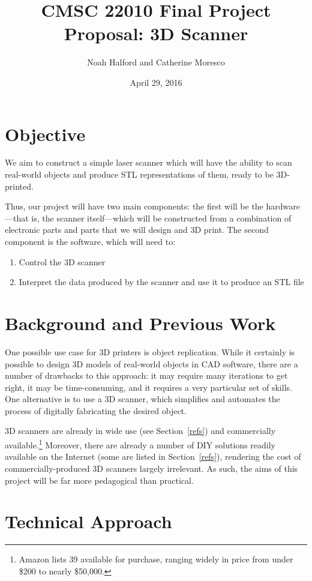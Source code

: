 \documentclass[12pt, letterpaper]{article}
\title{CMSC 22010 Final Project Proposal: 3D Scanner}
\author{Noah Halford and Catherine Moresco}
\date{April 29, 2016}
\begin{document}
\maketitle

\section{Objective}

We aim to construct a simple laser scanner which will have the ability to scan
real-world objects and produce STL representations of them, ready to be 3D-printed.

Thus, our project will have two main components: the first will be the hardware---that is,
the scanner itself---which will be constructed from a combination of electronic parts
and parts that we will design and 3D print. The second component is the software, which
will need to:
\begin{enumerate}
    \item Control the 3D scanner
    \item Interpret the data produced by the scanner and use it to produce an STL file
\end{enumerate}

\section{Background and Previous Work}

One possible use case for 3D printers is object replication. While it certainly is possible
to design 3D models of real-world objects in CAD software, there are a number of drawbacks
to this approach: it may require many iterations to get right, it may be time-consuming, and
it requires a very particular set of skills. One alternative is to use a 3D scanner, which
simplifies and automates the process of digitally fabricating the desired object.

3D scanners are already in wide use (see Section~\ref{refs}) and commercially
available.\footnote{Amazon lists 39 available for purchase, ranging widely in price from under
\$200 to nearly \$50,000.} Moreover, there are already a number of DIY solutions readily
available on the Internet (some are listed in Section~\ref{refs}), rendering the cost of
commercially-produced 3D scanners largely irrelevant. As such, the aims of this project
will be far more pedagogical than practical.

\section{Technical Approach}
\end{document}
